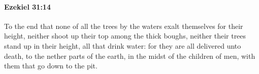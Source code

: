 
		\paragraph{Ezekiel 31:14} %
			\label{EZEKIEL-31-14}

			To the end that none of all the trees by the waters exalt themselves for their height, neither shoot up their top among the thick boughs, neither their trees stand up in their height, all that drink water: for they are all delivered unto death, to the nether parts of the earth, in the midst of the children of men, with them that go down to the pit.


